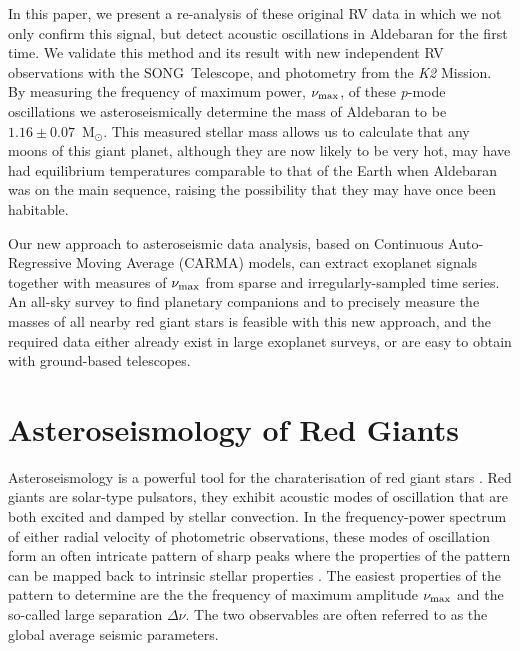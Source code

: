 \documentclass[modern]{aastex61}
\newcommand{\numax}{\mbox{$\nu_{\rm max}$}\xspace}
\newcommand{\Dnu}{\mbox{$\Delta \nu$}\xspace}
\newcommand{\msun}{\mbox{$\mathrm{M}_{\odot}$}\xspace}
\newcommand{\ktwo}{\emph{K2}\xspace}
\begin{document}
In this paper, we present a re-analysis of these original RV data in which we not only confirm this signal, but detect acoustic oscillations in Aldebaran for the first time. We validate this method and its result with new independent RV observations with the SONG~Telescope, and photometry from the \ktwo Mission. By measuring the frequency of maximum power, \numax, of these \emph{p}-mode oscillations we asteroseismically determine the mass of Aldebaran to be $1.16 \pm 0.07$~\msun. This measured stellar mass allows us to calculate that any moons of this giant planet, although they are now likely to be very hot, may have had equilibrium temperatures comparable to that of the Earth when Aldebaran was on the main sequence, raising the possibility that they may have once been habitable.

Our new approach to asteroseismic data analysis, based on Continuous Auto-Regressive Moving Average (CARMA) models, can extract exoplanet signals together with measures of \numax from sparse and irregularly-sampled time series. An all-sky survey to find planetary companions and to precisely measure the masses of all nearby red giant stars is feasible with this new approach, and the required data either already exist in large exoplanet surveys, or are easy to obtain with ground-based telescopes.

\section{Asteroseismology of Red Giants}
Asteroseismology is a powerful tool for the charaterisation of red giant stars \citep[see][for a detailed review]{2013ARA&A..51..353C}.  Red giants are solar-type pulsators, they exhibit acoustic modes of oscillation that are both excited and damped by stellar convection.  In the frequency-power spectrum of either radial velocity of photometric observations, these modes of oscillation form an often intricate pattern of sharp peaks where the properties of the pattern can be mapped back to intrinsic stellar properties \citep[e.g.,][]{2016AN....337..774D}.  The easiest properties of the pattern to determine are the the frequency of maximum amplitude \numax and the so-called large separation \Dnu \citep{Kjeldsen95}.  The two observables are often referred to as the global average seismic parameters.
\end{document}
